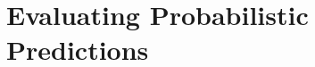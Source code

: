 \documentclass[t]{beamer}
\begin{document}

\section{Evaluating Probabilistic Predictions}
\end{document}
